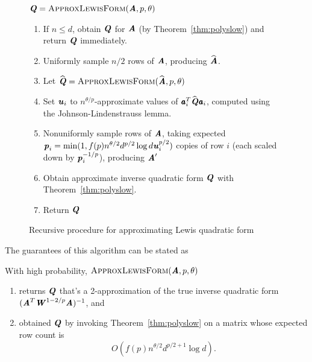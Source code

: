 \begin{figure}[ht]

\begin{algbox}

$ \QQ = \textsc{ApproxLewisForm}(\AA, p, \theta)$

\begin{enumerate}
\item
If $n \leq d$, obtain $\QQ$ for $\AA$ (by Theorem~\ref{thm:polyslow}) and return $\QQ$ immediately.
\item
Uniformly sample $n / 2$ rows of $\AA$, producing $\widehat \AA$.
\item
Let $\widehat \QQ = \textsc{ApproxLewisForm}(\widehat \AA, p, \theta)$
\item
Set $\uu_i$ to $n^{\theta / p}$-approximate values of $\aa_i^T \widehat \QQ \aa_i$, computed using
the Johnson-Lindenstrauss lemma.
\item
Nonuniformly sample rows of $\AA$, taking expected $\pp_i = \min(1, f(p) n^{\theta / 2} d^{p/2} \log d \uu_i^{p/2})$
copies of row $i$ (each scaled down by $\pp_i^{-1/p}$), producing $\AA'$
\item
Obtain approximate inverse quadratic form $\QQ$ with Theorem~\ref{thm:polyslow}.
\item
Return $\QQ$
\end{enumerate}
\end{algbox}

\caption{Recursive procedure for approximating Lewis quadratic form}
\label{fig:recurse}

\end{figure}

The guarantees of this algorithm can be stated as
\begin{lemma}
\label{lem:approxlewisform}
With high probability, $\textsc{ApproxLewisForm}(\AA, p, \theta)$
\begin{enumerate}
\item returns $\QQ$ that's a 2-approximation of the true inverse quadratic
form $(\AA^T \WW^{1-2/p} \AA)^{-1}$, and
\label{part:givesapprox}
\item obtained $\QQ$ by invoking Theorem~\ref{thm:polyslow} on a matrix whose
expected row count is
\begin{equation*}
O\left(f(p) n^{\theta /2} d^{p/2 + 1} \log d\right).
\end{equation*}
\label{part:boundedrows}
\end{enumerate}
\end{lemma}

